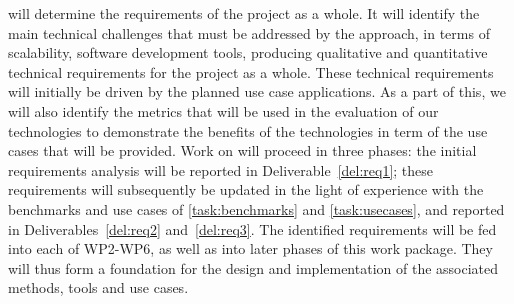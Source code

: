 \begin{Workpackage}{\thewpno}
\begin{WPDescription}
\end{WPDescription}

	

\begin{Task}


\TaskResults{
\ref{del:req1}
\ref{del:req2}
\ref{del:req3}
}
\TaskHeader{}

\theTask{} will determine the requirements of the project as a whole. It will identify the main technical challenges that must be addressed by the \TheProject{} approach, in terms of scalability, software development tools, producing qualitative and quantitative technical requirements for the project as a whole. These technical requirements will initially be driven by the planned use case applications. As a part of this, we will also identify the metrics that will be used in the evaluation of our technologies to demonstrate the benefits of the \TheProject{} technologies in term of the use cases that will be provided.
 Work  on \theTask{} will proceed in three phases: the initial requirements analysis will be reported in Deliverable~\ref{del:req1}; these requirements will subsequently be updated in the light of experience with the benchmarks and use cases of \ref{task:benchmarks} and \ref{task:usecases},
and reported in Deliverables~\ref{del:req2} and~\ref{del:req3}. 
%
The identified requirements will be fed into each of WP2-WP6, as well as into later phases of this work package.
They will thus form  a foundation for the design and implementation of the associated methods, tools and use cases. 
\end{Task}

\begin{Task}

\TaskResults{
\ref{del:eval1}
\ref{del:eval2}
\ref{del:eval3}
}
\TaskHeader{}


\end{Task}
\end{Workpackage}
